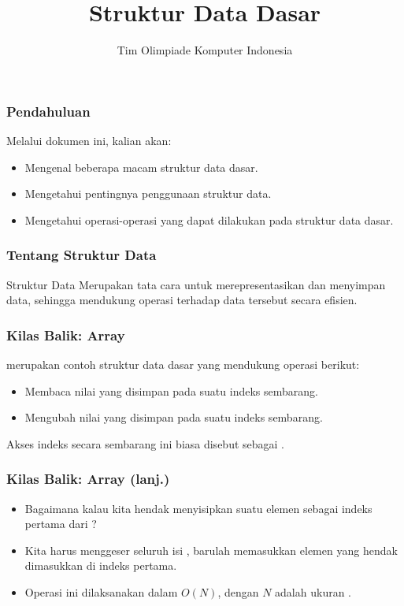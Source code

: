 

\title{Struktur Data Dasar}
\author{Tim Olimpiade Komputer Indonesia}
\date{}



\begin{frame}
\titlepage
\end{frame}

\begin{frame}
\frametitle{Pendahuluan}
Melalui dokumen ini, kalian akan:
\begin{itemize}
  \item Mengenal beberapa macam struktur data dasar.
  \item Mengetahui pentingnya penggunaan struktur data.
  \item Mengetahui operasi-operasi yang dapat dilakukan pada struktur data dasar.
\end{itemize}
\end{frame}

\begin{frame}
\frametitle{Tentang Struktur Data}
\begin{block}{Struktur Data}
Merupakan tata cara untuk merepresentasikan dan menyimpan data, sehingga mendukung operasi terhadap data tersebut secara efisien.
\end{block}
\end{frame}

\begin{frame}
\frametitle{Kilas Balik: Array}
 merupakan contoh struktur data dasar yang mendukung operasi berikut:
\begin{itemize}
  \item Membaca nilai yang disimpan pada suatu indeks sembarang.
  \item Mengubah nilai yang disimpan pada suatu indeks sembarang.
  \newline
\end{itemize}
Akses indeks secara sembarang ini biasa disebut sebagai .
\end{frame}

\begin{frame}
\frametitle{Kilas Balik: Array (lanj.)}
\begin{itemize}
  \item Bagaimana kalau kita hendak menyisipkan suatu elemen sebagai indeks pertama dari ?
  \item Kita harus menggeser seluruh isi , barulah memasukkan elemen yang hendak dimasukkan di indeks pertama.
  \item Operasi ini dilaksanakan dalam $O(N)$, dengan $N$ adalah ukuran .
\end{itemize}
\end{frame}


